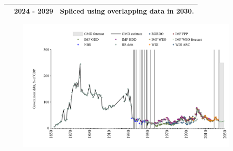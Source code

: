 \documentclass[12pt,a4paper,landscape]{article}
\begin{document}
\begin{adjustbox}{max totalsize={\paperwidth}{\paperheight},center}
\begin{minipage}[t][\textheight][t]{\textwidth}
\begin{table}[H]
\begin{tabular}{|l|l|l|}
\rowcolor{lightgray}\cite{IMF_WEO_forecast}& 2024 - 2029 &Spliced using overlapping data in 2030.\\
\hline
\end{tabular}
\end{table}
\begin{figure}[H]
\centering
\includegraphics[width=\textwidth,height=0.6\textheight,keepaspectratio]{graphs/TUR_govdebt_GDP.pdf}
\end{figure}
\end{minipage}
\end{adjustbox}
\end{document}
